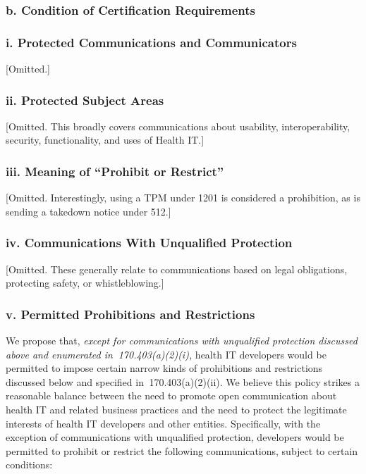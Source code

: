 \documentclass[twoside,11pt]{article}
\begin{document}
          \subsubsection{b. Condition of Certification Requirements}

          \subsubsection{i. Protected Communications and Communicators}


[Omitted.]

          \subsubsection{ii. Protected Subject Areas}

[Omitted. This broadly covers communications about usability, interoperability,
security, functionality, and uses of Health IT.]


          \subsubsection{iii. Meaning of “Prohibit or Restrict”}

[Omitted. Interestingly, using a TPM under 1201 is considered a prohibition, as
is sending a takedown notice under 512.]


          \subsubsection{iv. Communications With Unqualified Protection}

[Omitted. These generally relate to communications based on legal obligations,
protecting safety, or whistleblowing.]


          \subsubsection{v. Permitted Prohibitions and Restrictions}

          We propose that, \emph{except for communications with unqualified protection discussed above and enumerated in \textsection{} 170.403(a)(2)(i),} health IT developers would be permitted to impose certain narrow kinds of prohibitions and restrictions discussed below and specified in \textsection{} 170.403(a)(2)(ii). We believe this policy strikes a reasonable balance between the need to promote open communication about health IT and related business practices and the need to protect the legitimate interests of health IT developers and other entities. Specifically, with the exception of communications with unqualified protection, developers would be permitted to prohibit or restrict the following communications, subject to certain conditions:
\end{document}
